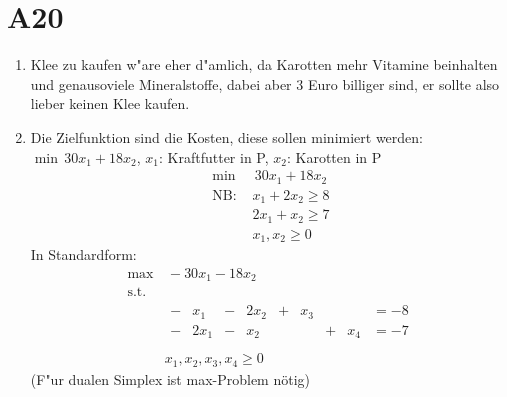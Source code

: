\documentclass[fleqn,12pt]{scrartcl}
\begin{document}
\section{A20}
\begin{enumerate}
	\item
Klee zu kaufen w"are eher d"amlich, da Karotten mehr Vitamine beinhalten und genausoviele Mineralstoffe, dabei aber 3 Euro billiger sind, er sollte also lieber keinen Klee kaufen.
\item
	Die Zielfunktion sind die Kosten, diese sollen minimiert werden: $\min\, 30x_1 + 18 x_2$, $x_1$: Kraftfutter in P, $x_2$: Karotten in P
	\begin{align*}
		\min &\,30x_1 + 18 x_2\\
		\text{NB: }& x_1 + 2x_2 \geq 8\\
							 & 2x_1 + x_2 \geq 7\\
				 &x_1, x_2 \geq 0
	\end{align*}
	In Standardform:
	\begin{align*}
		\max &\,-30x_1 - 18 x_2 \\
		\text{s.t.}& \\
												 &\begin{array}{ccccccccc}
		-&x_1 &- &2x_2 &+ &x_3&& &=-8\\
		-&2x_1 &- &x_2 & &&+ &x_4 &= -7\\
	\end{array}\\
	&x_1, x_2, x_3, x_4 \geq 0
	\end{align*}
	(F"ur dualen Simplex ist max-Problem nötig)


\end{enumerate}
\end{document}
